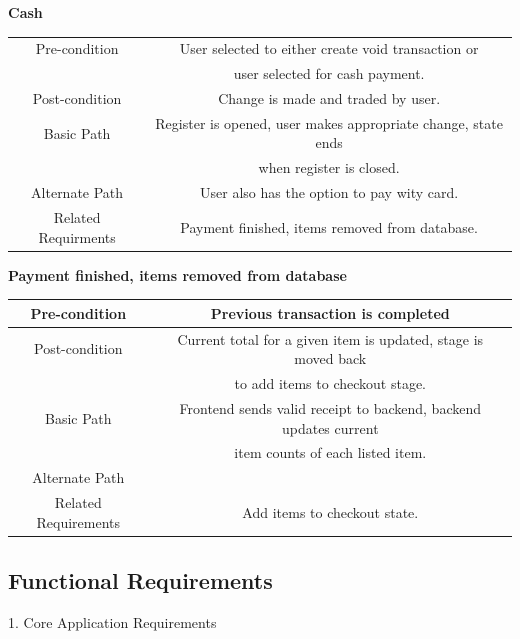 \begin{center}
\textbf{Cash}\\
\begin{tabular}{|c|c|} \hline
Pre-condition & User selected to either create void transaction or \\
& user selected for cash payment. \\ \hline
Post-condition & Change is made and traded by user. \\ \hline
Basic Path & Register is opened, user makes appropriate change, state ends\\
& when register is closed. \\ \hline
Alternate Path & User also has the option to pay wity card. \\ \hline
Related Requirments & Payment finished, items removed from database. \\ \hline 
\end{tabular}\vspace{2em}
\newpage

\textbf{Payment finished, items removed from database}
\begin{tabular}{|c|c|}\hline
Pre-condition & Previous transaction is completed \\ \hline
Post-condition & Current total for a given item is updated, stage is moved back \\
& to add items to checkout stage. \\ \hline
Basic Path & Frontend sends valid receipt to backend, backend updates current\\
& item counts of each listed item. \\ \hline
Alternate Path & \\ \hline
Related Requirements & Add items to checkout state. \\ \hline
\end{tabular}\vspace{2em}
\end{center}


\subsection{Functional Requirements}

1. Core Application Requirements

